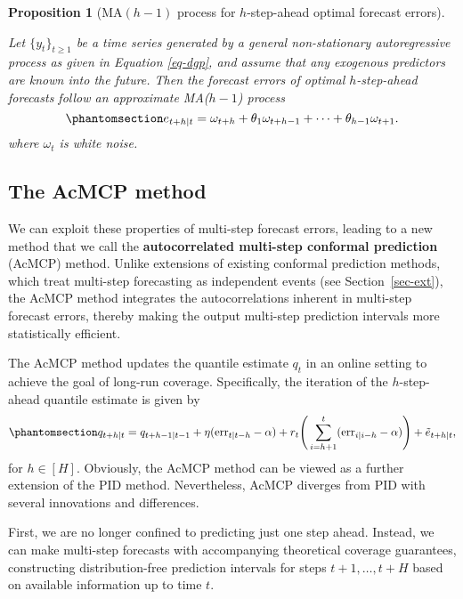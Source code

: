 \documentclass[
  11pt,
  12pt]{article}
\theoremstyle{plain}
\newtheorem{proposition}{Proposition}[section]
\theoremstyle{remark}
\begin{document}
\begin{proposition}[MA\((h-1)\) process for \(h\)-step-ahead optimal
forecast errors]\protect\hypertarget{prp-ma}{}\label{prp-ma}

Let \(\{y_t\}_{t \geq 1}\) be a time series generated by a general
non-stationary autoregressive process as given in Equation
\eqref{eq-dgp}, and assume that any exogenous predictors are known into
the future. Then the forecast errors of optimal \(h\)-step-ahead
forecasts follow an approximate MA(\(h-1\)) process
\begin{equation}\phantomsection\label{eq-ma}{
e_{t+h|t} = \omega_{t+h} + \theta_1\omega_{t+h-1} + \cdots + \theta_{h-1}\omega_{t+1}.
}\end{equation} where \(\omega_{t}\) is white noise.

\end{proposition}

\subsection{The AcMCP method}\label{sec-novel}

We can exploit these properties of multi-step forecast errors, leading
to a new method that we call the \textbf{autocorrelated multi-step
conformal prediction} (AcMCP) method. Unlike extensions of existing
conformal prediction methods, which treat multi-step forecasting as
independent events (see Section~\ref{sec-ext}), the AcMCP method
integrates the autocorrelations inherent in multi-step forecast errors,
thereby making the output multi-step prediction intervals more
statistically efficient.

The AcMCP method updates the quantile estimate \(q_t\) in an online
setting to achieve the goal of long-run coverage. Specifically, the
iteration of the \(h\)-step-ahead quantile estimate is given by
\begin{equation}\phantomsection\label{eq-acmcp}{
q_{t+h|t}=q_{t+h-1|t-1}+\eta (\mathrm{err}_{t|t-h}-\alpha)+r_t\Bigg(\sum_{i=h+1}^t (\mathrm{err}_{i|i-h}-\alpha)\Bigg)+\tilde{e}_{t+h|t},
}\end{equation} for \(h\in[H]\). Obviously, the AcMCP method can be
viewed as a further extension of the PID method. Nevertheless, AcMCP
diverges from PID with several innovations and differences.

First, we are no longer confined to predicting just one step ahead.
Instead, we can make multi-step forecasts with accompanying theoretical
coverage guarantees, constructing distribution-free prediction intervals
for steps \(t+1,\ldots,t+H\) based on available information up to time
\(t\).
\end{document}

